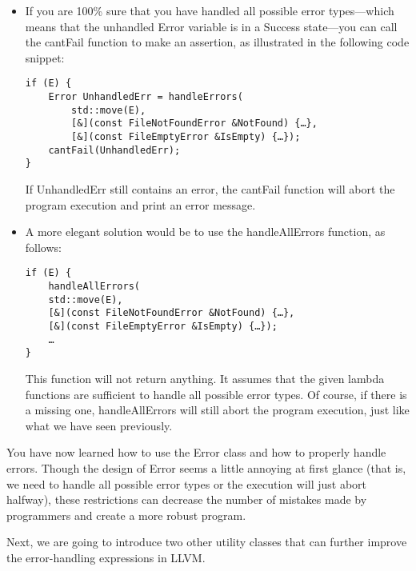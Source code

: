 \begin{itemize}
\item If you are 100\% sure that you have handled all possible error types—which means that the unhandled Error variable is in a Success state—you can call the cantFail function to make an assertion, as illustrated in the following code snippet:

\begin{lstlisting}[style=styleCXX]
if (E) {
	Error UnhandledErr = handleErrors(
		std::move(E),
		[&](const FileNotFoundError &NotFound) {…},
		[&](const FileEmptyError &IsEmpty) {…});
	cantFail(UnhandledErr);
}
\end{lstlisting}

If UnhandledErr still contains an error, the cantFail function will abort the program execution and print an error message.

\item A more elegant solution would be to use the handleAllErrors function, as follows:

\begin{lstlisting}[style=styleCXX]
if (E) {
	handleAllErrors(
	std::move(E),
	[&](const FileNotFoundError &NotFound) {…},
	[&](const FileEmptyError &IsEmpty) {…});
	…
}
\end{lstlisting}

This function will not return anything. It assumes that the given lambda functions are sufficient to handle all possible error types. Of course, if there is a missing one, handleAllErrors will still abort the program execution, just like what we have seen previously.

\end{itemize}

You have now learned how to use the Error class and how to properly handle errors. Though the design of Error seems a little annoying at first glance (that is, we need to handle all possible error types or the execution will just abort halfway), these restrictions can decrease the number of mistakes made by programmers and create a more robust program.

Next, we are going to introduce two other utility classes that can further improve the error-handling expressions in LLVM.














